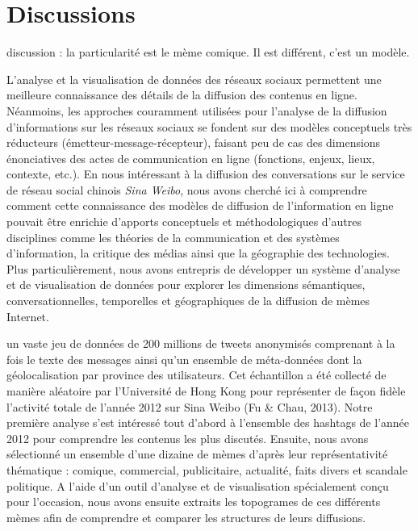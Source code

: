 \section[Discussions]{Discussions}


discussion : la particularité est le mème comique. Il est différent, c'est un modèle.


L{\textquoteright}analyse et la visualisation de donn\'ees des r\'eseaux  sociaux permettent une meilleure connaissance des d\'etails de la  diffusion des contenus en ligne. N\'eanmoins, les approches couramment  utilis\'ees pour l{\textquoteright}analyse de la diffusion  d{\textquoteright}informations sur les r\'eseaux sociaux se fondent sur  des mod\`eles conceptuels tr\`es r\'educteurs  (\'emetteur-message-r\'ecepteur), faisant peu de cas des dimensions  \'enonciatives des actes de communication en ligne (fonctions, enjeux,  lieux, contexte, etc.). En nous int\'eressant \`a la diffusion des  conversations sur le service de r\'eseau social chinois \textit{Sina  Weibo}, nous avons cherch\'e ici \`a comprendre comment cette  connaissance des mod\`eles de diffusion de  l{\textquoteright}information en ligne pouvait \^etre enrichie  d{\textquoteright}apports conceptuels et m\'ethodologiques  d{\textquoteright}autres disciplines comme les th\'eories de la  communication et des syst\`emes d{\textquoteright}information, la  critique des m\'edias ainsi que la g\'eographie des technologies. Plus  particuli\`erement, nous avons entrepris de d\'evelopper un syst\`eme  d{\textquoteright}analyse et de visualisation de donn\'ees pour  explorer les dimensions s\'emantiques, conversationnelles, temporelles  et g\'eographiques de la diffusion de m\`emes Internet.   
 
un vaste jeu de données de 200 millions de tweets anonymisés comprenant à la fois le texte des messages ainsi qu{\textquoteright}un ensemble de méta-données dont la géolocalisation par province des utilisateurs. Cet échantillon a été collecté de manière aléatoire par l{\textquoteright}Université de Hong Kong pour représenter de fa\c{c}on fidèle l{\textquoteright}activité totale de l{\textquoteright}année 2012 sur Sina Weibo (Fu \& Chau, 2013). Notre première analyse s{\textquoteright}est intéressé tout d{\textquoteright}abord à l{\textquoteright}ensemble des hashtags de l{\textquoteright}année 2012 pour comprendre les contenus les plus discutés. Ensuite, nous avons sélectionné un ensemble d{\textquoteright}une dizaine de mèmes d{\textquoteright}après leur représentativité thématique : comique, commercial, publicitaire, actualité, faits divers et scandale politique. A l{\textquoteright}aide d{\textquoteright}un outil d{\textquoteright}analyse et de visualisation spécialement con\c{c}u pour l{\textquoteright}occasion, nous avons ensuite extraits les topogrames de ces différents mèmes afin de comprendre et comparer les structures de leurs diffusions.


